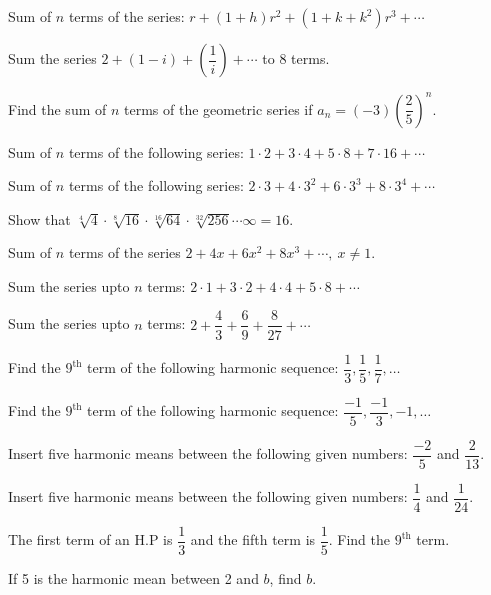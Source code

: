 \documentclass[11pt,a4paper]{article}
\begin{document}
\begin{shortlist}
\item Sum of $n$ terms of the series: $r+(1+h)r^2+(1+k+k^2)r^3+\cdots$

\item Sum the series $2+(1-i)+\left(\dfrac{1}{i}\right)+\cdots$ to 8 terms.

\item Find the sum of $n$ terms of the geometric series if $a_n=(-3)\left(\dfrac{2}{5}\right)^n$.

\item Sum of $n$ terms of the following series: $1\cdot 2+3\cdot 4+5\cdot 8+7\cdot 16+\cdots$

\item Sum of $n$ terms of the following series: $2\cdot 3+4\cdot 3^2+6\cdot 3^3+8\cdot 3^4+\cdots$

\item Show that $\sqrt[4]{4}\cdot\sqrt[8]{16}\cdot\sqrt[16]{64}\cdot\sqrt[32]{256}\cdots\infty=16$.

\item Sum of $n$ terms of the series $2+4x+6x^2+8x^3+\cdots,\ x\neq 1$.

\item Sum the series upto $n$ terms: $2\cdot 1+3\cdot 2+4\cdot 4+5\cdot 8+\cdots$

\item Sum the series upto $n$ terms: $2+\dfrac{4}{3}+\dfrac{6}{9}+\dfrac{8}{27}+\cdots$

\item Find the $9^{\text{th}}$ term of the following harmonic sequence: $\dfrac{1}{3},\dfrac{1}{5},\dfrac{1}{7},\ldots$

\item Find the $9^{\text{th}}$ term of the following harmonic sequence: $\dfrac{-1}{5},\dfrac{-1}{3},-1,\ldots$

\item Insert five harmonic means between the following given numbers: $\dfrac{-2}{5}$ and $\dfrac{2}{13}$.

\item Insert five harmonic means between the following given numbers: $\dfrac{1}{4}$ and $\dfrac{1}{24}$.

\item The first term of an H.P is $\dfrac{1}{3}$ and the fifth term is $\dfrac{1}{5}$. Find the $9^{\text{th}}$ term.

\item If 5 is the harmonic mean between 2 and $b$, find $b$.


\end{shortlist}
\end{document}
